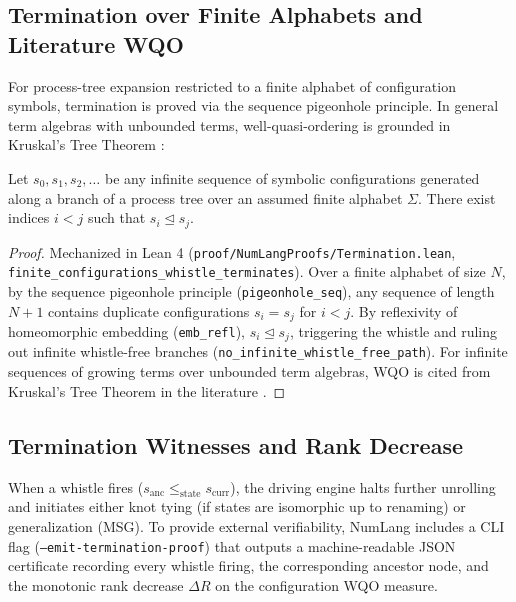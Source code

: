 \subsection{Termination over Finite Alphabets and Literature WQO}
For process-tree expansion restricted to a finite alphabet of configuration symbols, termination is proved via the sequence pigeonhole principle. In general term algebras with unbounded terms, well-quasi-ordering is grounded in Kruskal's Tree Theorem \cite{kruskal1960well}:
\begin{theorem}
\label{thm:termination}
Let $s_0, s_1, s_2, \dots$ be any infinite sequence of symbolic configurations generated along a branch of a process tree over an assumed finite alphabet $\Sigma$. There exist indices $i < j$ such that $s_i \trianglelefteq s_j$.
\end{theorem}
\begin{proof}
Mechanized in Lean 4 (\texttt{proof/NumLangProofs/Termination.lean}, \texttt{finite\_configurations\_whistle\_terminates}). Over a finite alphabet of size $N$, by the sequence pigeonhole principle (\texttt{pigeonhole\_seq}), any sequence of length $N+1$ contains duplicate configurations $s_i = s_j$ for $i < j$. By reflexivity of homeomorphic embedding (\texttt{emb\_refl}), $s_i \trianglelefteq s_j$, triggering the whistle and ruling out infinite whistle-free branches (\texttt{no\_infinite\_whistle\_free\_path}). For infinite sequences of growing terms over unbounded term algebras, WQO is cited from Kruskal's Tree Theorem in the literature \cite{kruskal1960well,leuschel1998homeomorphic}.
\end{proof}

\subsection{Termination Witnesses and Rank Decrease}
When a whistle fires ($s_{\text{anc}} \le_{\text{state}} s_{\text{curr}}$), the driving engine halts further unrolling and initiates either knot tying (if states are isomorphic up to renaming) or generalization (MSG). To provide external verifiability, NumLang includes a CLI flag (\texttt{--emit-termination-proof}) that outputs a machine-readable JSON certificate recording every whistle firing, the corresponding ancestor node, and the monotonic rank decrease $\Delta R$ on the configuration WQO measure.



